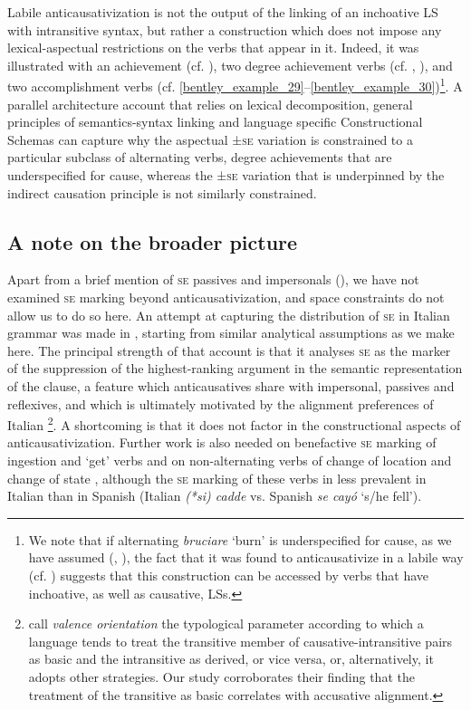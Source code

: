 \documentclass[output=paper,colorlinks,citecolor=brown
]{langscibook}
\begin{document}
Labile anticausativization is not the output of the linking of an inchoative LS with intransitive syntax, but rather a construction which does not impose any lexical-aspectual restrictions on the verbs that appear in it. Indeed, it was illustrated with an achievement (cf. ), two degree achievement verbs (cf. , ), and two accomplishment verbs (cf. \ref{bentley_example_29}--\ref{bentley_example_30})\footnote{We note that if alternating \textit{bruciare} ‘burn’ is underspecified for cause, as we have assumed (, ), the fact that it was found to anticausativize in a labile way (cf. ) suggests that this construction can be accessed by verbs that have inchoative, as well as causative, LSs.}.  A parallel architecture account that relies on lexical decomposition, general principles of semantics-syntax linking and language specific Constructional Schemas can capture why the aspectual ±\textsc{se} variation is constrained to a particular subclass of alternating verbs, degree achievements that are underspecified for cause, whereas the ±\textsc{se} variation that is underpinned by the indirect causation principle is not similarly constrained.  

\subsection{A note on the broader picture}
\label{bentley_section_5.5}

Apart from a brief mention of \textsc{se} passives and impersonals (), we have not examined \textsc{se} marking beyond anticausativization, and space constraints do not allow us to do so here. An attempt at capturing the distribution of \textsc{se} in Italian grammar was made in \citet{bentley2006split}, starting from similar analytical assumptions as we make here. The principal strength of that account is that it analyses \textsc{se} as the marker of the suppression of the highest-ranking argument in the semantic representation of the clause, a feature which anticausatives share with impersonal, passives and reflexives, and which is ultimately motivated by the alignment preferences of Italian \footnote{\citet{nichols2004transitivizing} call \textit{valence orientation} the typological parameter according to which a language tends to treat the transitive member of causative-intransitive pairs as basic and the intransitive as derived, or vice versa, or, alternatively, it adopts other strategies. Our study corroborates their finding that the treatment of the transitive as basic correlates with accusative alignment.}.  A shortcoming is that it does not factor in the constructional aspects of anticausativization. Further work is also needed on benefactive \textsc{se} marking of ingestion and ‘get’ verbs \citep[153--154]{bentley2006split} and on non-alternating verbs of change of location and change of state \citep{miguel2000operador,gonzales2006construcciones,jimenez2017causativity}, although the \textsc{se} marking of these verbs in less prevalent in Italian than in Spanish (Italian \textit{(*si) cadde} vs. Spanish \textit{se cayó} ‘s/he fell’). 
\end{document}
